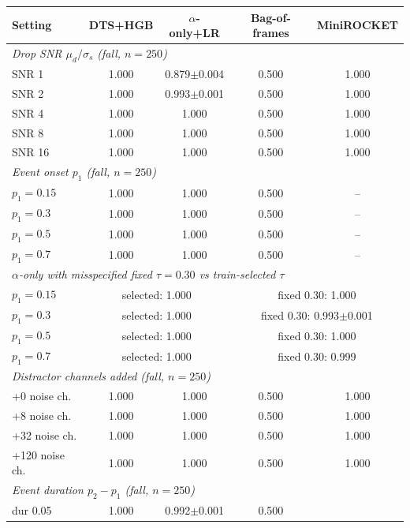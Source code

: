 \begin{table}[h]
\centering
\small
\begin{tabular}{lcccc}
\toprule
Setting & DTS+HGB & $\alpha$-only+LR & Bag-of-frames & MiniROCKET \\
\midrule
\multicolumn{5}{l}{\emph{Drop SNR $\mu_d/\sigma_s$ (fall, $n{=}250$)}} \\
SNR 1 & 1.000 & 0.879{\scriptsize$\pm$0.004} & 0.500 & 1.000 \\
SNR 2 & 1.000 & 0.993{\scriptsize$\pm$0.001} & 0.500 & 1.000 \\
SNR 4 & 1.000 & 1.000 & 0.500 & 1.000 \\
SNR 8 & 1.000 & 1.000 & 0.500 & 1.000 \\
SNR 16 & 1.000 & 1.000 & 0.500 & 1.000 \\
\midrule
\multicolumn{5}{l}{\emph{Event onset $p_1$ (fall, $n{=}250$)}} \\
$p_1{=}0.15$ & 1.000 & 1.000 & 0.500 & -- \\
$p_1{=}0.3$ & 1.000 & 1.000 & 0.500 & -- \\
$p_1{=}0.5$ & 1.000 & 1.000 & 0.500 & -- \\
$p_1{=}0.7$ & 1.000 & 1.000 & 0.500 & -- \\
\midrule
\multicolumn{5}{l}{\emph{$\alpha$-only with misspecified fixed $\tau{=}0.30$ vs train-selected $\tau$}} \\
$p_1{=}0.15$ & \multicolumn{2}{c}{selected: 1.000} & \multicolumn{2}{c}{fixed 0.30: 1.000} \\
$p_1{=}0.3$ & \multicolumn{2}{c}{selected: 1.000} & \multicolumn{2}{c}{fixed 0.30: 0.993{\scriptsize$\pm$0.001}} \\
$p_1{=}0.5$ & \multicolumn{2}{c}{selected: 1.000} & \multicolumn{2}{c}{fixed 0.30: 1.000} \\
$p_1{=}0.7$ & \multicolumn{2}{c}{selected: 1.000} & \multicolumn{2}{c}{fixed 0.30: 0.999} \\
\midrule
\multicolumn{5}{l}{\emph{Distractor channels added (fall, $n{=}250$)}} \\
+0 noise ch. & 1.000 & 1.000 & 0.500 & 1.000 \\
+8 noise ch. & 1.000 & 1.000 & 0.500 & 1.000 \\
+32 noise ch. & 1.000 & 1.000 & 0.500 & 1.000 \\
+120 noise ch. & 1.000 & 1.000 & 0.500 & 1.000 \\
\midrule
\multicolumn{4}{l}{\emph{Event duration $p_2{-}p_1$ (fall, $n{=}250$)}} \\
dur 0.05 & 1.000 & 0.992{\scriptsize$\pm$0.001} & 0.500 \\

\end{tabular}
\end{table}
